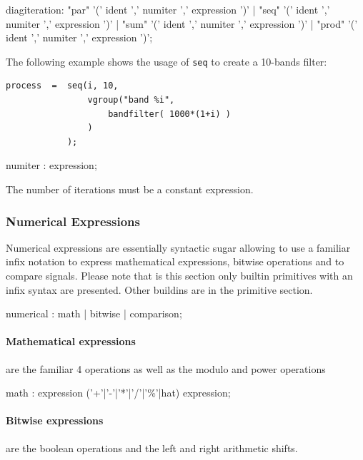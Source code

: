 \documentclass{article}
\begin{document}
      
\begin{rail}
diagiteration: "par" '(' ident ',' numiter ',' expression ')'
           | "seq" '(' ident ',' numiter ',' expression ')'
           | "sum" '(' ident ',' numiter ',' expression ')'
           | "prod" '(' ident ',' numiter ',' expression ')';
\end{rail}

The following example shows the usage of  \lstinline'seq' to create a 10-bands filter:

\begin{lstlisting}
process  =	seq(i, 10, 
				vgroup("band %i", 
					bandfilter( 1000*(1+i) ) 
				) 
			);
\end{lstlisting}


           
\begin{rail}
numiter : expression;
\end{rail}
The number of iterations must be a constant expression. 


\subsubsection{Numerical Expressions}

Numerical expressions are essentially syntactic sugar allowing to use a familiar infix notation to express mathematical expressions, bitwise operations and to compare signals. Please note that is this section only builtin primitives with an infix syntax are presented. Other buildins are in the primitive section. 

\begin{rail}
numerical : math | bitwise | comparison;
\end{rail}

\paragraph{Mathematical expressions} are the familiar 4 operations as well as the modulo and power operations
\begin{rail}
math : expression ('+'|'-'|'*'|'/'|'\%'|hat) expression;
\end{rail}
 

\paragraph{Bitwise expressions} are the boolean operations and the left and right arithmetic shifts.
\end{document}
